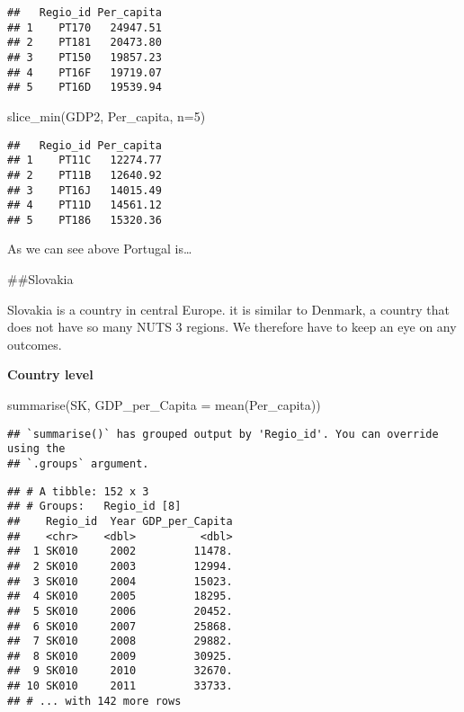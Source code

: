 \documentclass[
]{article}
\newenvironment{Shaded}{\begin{snugshade}}{\end{snugshade}}
\newcommand{\AttributeTok}[1]{\textcolor[rgb]{0.77,0.63,0.00}{#1}}
\newcommand{\DecValTok}[1]{\textcolor[rgb]{0.00,0.00,0.81}{#1}}
\newcommand{\FunctionTok}[1]{\textcolor[rgb]{0.00,0.00,0.00}{#1}}
\newcommand{\NormalTok}[1]{#1}
\begin{document}
\begin{verbatim}
##   Regio_id Per_capita
## 1    PT170   24947.51
## 2    PT181   20473.80
## 3    PT150   19857.23
## 4    PT16F   19719.07
## 5    PT16D   19539.94
\end{verbatim}

\begin{Shaded}
\begin{Highlighting}[]
\FunctionTok{slice\_min}\NormalTok{(GDP2, Per\_capita, }\AttributeTok{n=}\DecValTok{5}\NormalTok{)}
\end{Highlighting}
\end{Shaded}

\begin{verbatim}
##   Regio_id Per_capita
## 1    PT11C   12274.77
## 2    PT11B   12640.92
## 3    PT16J   14015.49
## 4    PT11D   14561.12
## 5    PT186   15320.36
\end{verbatim}

As we can see above Portugal is\ldots{}

\#\#Slovakia

Slovakia is a country in central Europe. it is similar to Denmark, a
country that does not have so many NUTS 3 regions. We therefore have to
keep an eye on any outcomes.

\textbf{Country level}

\begin{Shaded}
\begin{Highlighting}[]
    \FunctionTok{summarise}\NormalTok{(SK, }\AttributeTok{GDP\_per\_Capita =} \FunctionTok{mean}\NormalTok{(Per\_capita))}
\end{Highlighting}
\end{Shaded}

\begin{verbatim}
## `summarise()` has grouped output by 'Regio_id'. You can override using the
## `.groups` argument.
\end{verbatim}

\begin{verbatim}
## # A tibble: 152 x 3
## # Groups:   Regio_id [8]
##    Regio_id  Year GDP_per_Capita
##    <chr>    <dbl>          <dbl>
##  1 SK010     2002         11478.
##  2 SK010     2003         12994.
##  3 SK010     2004         15023.
##  4 SK010     2005         18295.
##  5 SK010     2006         20452.
##  6 SK010     2007         25868.
##  7 SK010     2008         29882.
##  8 SK010     2009         30925.
##  9 SK010     2010         32670.
## 10 SK010     2011         33733.
## # ... with 142 more rows
\end{verbatim}
\end{document}
